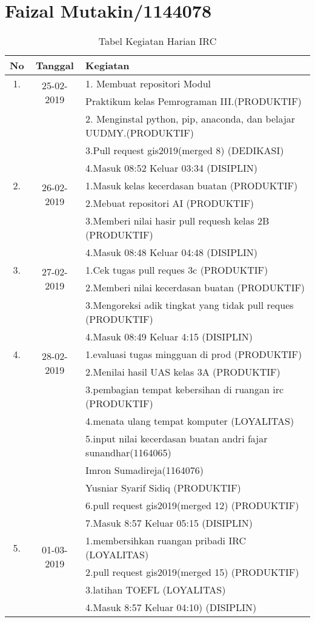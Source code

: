 \chapter{Faizal Mutakin/1144078}


\begin{table}[h]
\caption{Tabel Kegiatan Harian IRC}
\centering
\begin{tabular}{|c|c|l|}
\hline
No&Tanggal&Kegiatan\\
\hline
1.&\multirow{2}{*}{25-02-2019}&1. Membuat repositori Modul\\
&&Praktikum kelas Pemrograman III.(PRODUKTIF)\\
&&2. Menginstal python, pip, anaconda, dan belajar UUDMY.(PRODUKTIF)\\
&&3.Pull request gis2019(merged 8) (DEDIKASI)\\
&&4.Masuk 08:52 Keluar 03:34 (DISIPLIN)\\
\hline
2.&\multirow{2}{*}{26-02-2019}&1.Masuk kelas kecerdasan buatan (PRODUKTIF)\\
&&2.Mebuat repositori AI (PRODUKTIF)\\
&&3.Memberi nilai hasir pull requesh kelas 2B (PRODUKTIF)\\
&&4.Masuk 08:48 Keluar 04:48 (DISIPLIN)\\
\hline
3.&\multirow{2}{*}{27-02-2019}&1.Cek tugas pull reques 3c (PRODUKTIF)\\
&&2.Memberi nilai kecerdasan buatan (PRODUKTIF)\\
&&3.Mengoreksi adik tingkat yang tidak pull reques (PRODUKTIF)\\
&&4.Masuk 08:49 Keluar 4:15 (DISIPLIN)\\
\hline
4.&\multirow{2}{*}{28-02-2019}&1.evaluasi tugas mingguan di prod (PRODUKTIF)\\
&&2.Menilai hasil UAS kelas 3A (PRODUKTIF)\\
&&3.pembagian tempat kebersihan di ruangan irc (PRODUKTIF)\\
&&4.menata ulang tempat komputer (LOYALITAS)\\
&&5.input nilai kecerdasan buatan andri fajar sunandhar(1164065)\\
&&Imron Sumadireja(1164076)\\
&&Yusniar Syarif Sidiq (PRODUKTIF)\\
&&6.pull request gis2019(merged 12) (PRODUKTIF)\\
&&7.Masuk 8:57 Keluar 05:15 (DISIPLIN)\\
\hline
5.&\multirow{2}{*}{01-03-2019}&1.membersihkan ruangan pribadi IRC (LOYALITAS)\\
&&2.pull request gis2019(merged 15) (PRODUKTIF)\\
&&3.latihan TOEFL (LOYALITAS)\\
&&4.Masuk 8:57 Keluar 04:10) (DISIPLIN)\\
\hline
\end{tabular}
\label{table:contoh}
\end{table}
 
